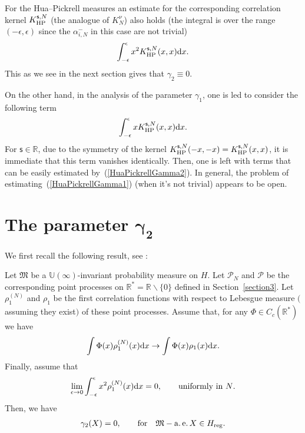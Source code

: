 \begin{Remark}\label{EstimatesHuaPickrell}
For the Hua--Pickrell measures an estimate for the corresponding correlation kernel $K_{\rm HP}^{\mathsf{s},N}$ (the analogue of $K_{N}^{\nu}$) also holds (the integral is over the range $(-\epsilon,\epsilon)$ since the $\alpha_{i,N}^-$ in this case are not trivial)
\begin{gather}\label{HuaPickrellGamma2}
\int_{-\epsilon}^{\epsilon}x^2K_{\rm HP}^{\mathsf{s},N}(x,x){\rm d}x.
\end{gather}
This as we see in the next section gives that $\gamma_2 \equiv 0$.

On the other hand, in the analysis of the parameter $\gamma_1$, one is led to consider the following term
\begin{gather}\label{HuaPickrellGamma1}
\int_{-\epsilon}^{\epsilon}xK_{\rm HP}^{\mathsf{s},N}(x,x){\rm d}x.
\end{gather}
For $\mathsf{s} \in \mathbb{R}$, due to the symmetry of the kernel $K_{\rm HP}^{\mathsf{s},N}(-x,-x)=K_{\rm HP}^{\mathsf{s},N}(x,x)$, it is immediate that this term vanishes identically. Then, one is left with terms that can be easily estimated by~(\ref{HuaPickrellGamma2}). In general, the problem of estimating~(\ref{HuaPickrellGamma1}) (when it's not trivial) appears to be open.
\end{Remark}

\section[The parameter $\gamma_2$]{The parameter $\boldsymbol{\gamma_2}$}\label{section6}

We first recall the following result, see \cite[Proposition~7.2]{BorodinOlshanskiErgodic}:

\begin{Proposition}\label{BorodinOlshanskiGamm2}
Let $\mathfrak{M}$ be a $\mathbb{U}(\infty)$-invariant probability measure on $H$. Let $\mathcal{P}_N$ and $\mathcal{P}$ be the corresponding point processes on $\mathbb{R}^*=\mathbb{R}\backslash\{0\}$ defined in Section~{\rm \ref{section3}}. Let $\rho_1^{(N)}$ and $\rho_1$ be the first correlation functions with respect to Lebesgue measure $($assuming they exist$)$ of these point processes. Assume that, for any $\Phi\in C_c (\mathbb{R}^*)$ we have
\begin{gather}\label{ConvergenceCorrelationGamma2}
\int \Phi(x)\rho_1^{(N)}(x){\rm d}x\to \int \Phi(x)\rho_1(x){\rm d}x.
\end{gather}
Finally, assume that
\begin{gather}\label{UniformEstimateGamma2}
\lim_{\epsilon \to 0} \int_{-\epsilon}^{\epsilon}x^2 \rho_1^{(N)}(x){\rm d}x=0, \qquad \text{uniformly in $N$}.
\end{gather}
Then, we have
\begin{gather*}
\gamma_2(X)=0, \qquad \text{for} \quad \mathfrak{M}-\operatorname{a.e.} X \in H_{{\rm reg}}.
\end{gather*}
\end{Proposition}

